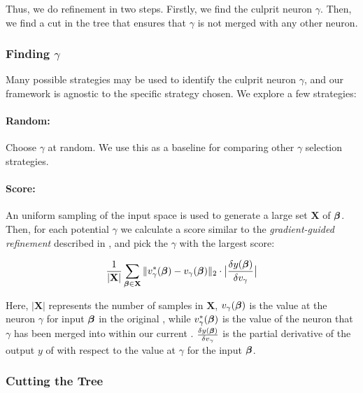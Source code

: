 Thus, we do refinement in two steps. Firstly, we find the culprit neuron
$\gamma$. Then, we find a cut in the tree that ensures that $\gamma$ is not
merged with any other neuron.

\subsubsection{Finding $\gamma$}
\label{s:finding-gamma}

Many possible strategies may be used to identify the culprit neuron $\gamma$,
and our framework is agnostic to the specific strategy chosen. We explore a few
strategies: 

\paragraph*{Random:} Choose $\gamma$ at random. We use this as a
baseline for comparing other $\gamma$ selection strategies. 

\paragraph*{Score:} An uniform sampling of the input space is used to
generate a large set $\mathbf{X}$ of \gencex $\boldsymbol{\beta}$. Then, for each
potential $\gamma$ we calculate a score similar to the \textit{gradient-guided
refinement} described in \cite{lin-comb-abs-jan}, and pick the $\gamma$ with the
largest score:

\begin{equation*}
\begin{aligned}
    \frac{1}{|\mathbf{X}|} \sum_{\boldsymbol{\beta} \in \mathbf{X}} 
    \|v^{*}_{\gamma}(\boldsymbol{\beta}) - v_{\gamma}(\boldsymbol{\beta})\|_{2} \cdot 
    \big| \frac{\delta y(\boldsymbol{\beta})}{\delta v_{\gamma}} \big|
\end{aligned}
\end{equation*}

Here, $| \mathbf{X}|$ represents the number of samples in $\mathbf{X}$, 
$v_{\gamma}(\boldsymbol{\beta})$ is the value at the neuron $\gamma$ for input
$\boldsymbol{\beta}$ in the original \cnc, while $v^{*}_{\gamma}(\boldsymbol{\beta})$ is the
value of the neuron that $\gamma$ has been merged into within our current \abs.
$\frac{\delta y(\boldsymbol{\beta})}{\delta v_{\gamma}}$ is the partial derivative of
the output $y$ of \cnc with respect to the value at $\gamma$ for the input
$\boldsymbol{\beta}$.

\subsubsection{Cutting the Tree}

